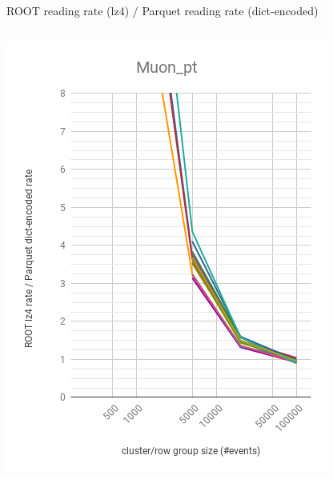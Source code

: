 \documentclass[aspectratio=169]{beamer}
\begin{document}
\begin{frame}{ROOT reading rate (lz4) / Parquet reading rate (dict-encoded)}
\vspace{-0.15 cm}

\begin{columns}
\begin{center}
\includegraphics[width=\linewidth]{root-lz4-parquet-dict-Muon_pt.png}
\end{center}
\begin{center}

\end{center}
\end{columns}
\end{frame}
\end{document}
